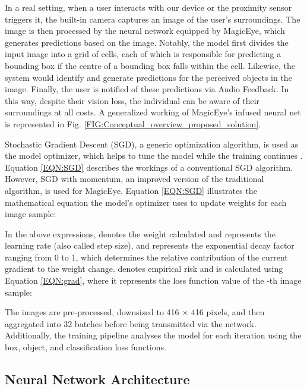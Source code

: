 \documentclass[journal,12pt,onecolumn,letterpaper]{IEEEtran}
\begin{document}
In a real setting, when a user interacts with our device or the proximity sensor triggers it, the built-in camera captures an image of the user's surroundings. The image is then processed by the neural network equipped by MagicEye, which generates predictions based on the image. Notably, the model first divides the input image into a grid of cells, each of which is responsible for predicting a bounding box if the centre of a bounding box falls within the cell. Likewise, the system would identify and generate predictions for the perceived objects in the image. Finally, the  user is notified of these predictions via Audio Feedback. In this way, despite their vision loss, the individual can be aware of their surroundings at all costs. A generalized working of MagicEye’s infused neural net is represented in Fig. \ref{FIG:Conceptual_overview_proposed_solution}.





Stochastic Gradient Descent (SGD), a generic optimization algorithm, is used as the model optimizer, which helps to tune the model while the training continues \cite{amir_sgd_2021}. Equation \ref{EQN:SGD} describes the workings of a conventional SGD algorithm. However, SGD with momentum, an improved version of the traditional algorithm, is used for MagicEye. Equation \ref{EQN:SGD} illustrates the mathematical equation the model's optimizer uses to update weights for each image sample:

In the above expressions,  denotes the weight calculated and  represents the learning rate (also called step size), and  represents the exponential decay factor ranging from 0 to 1, which determines the relative contribution of the current gradient to the weight change.   denotes empirical risk and is calculated using Equation \ref{EQN:grad}, where it represents the loss function value of the -th image sample:


The images are pre-processed, downsized to 416 × 416 pixels, and then aggregated into 32 batches before being transmitted via the network. Additionally, the training pipeline analyses the model for each iteration using the box, object, and classification loss functions.


\subsection{Neural Network Architecture}
\end{document}
